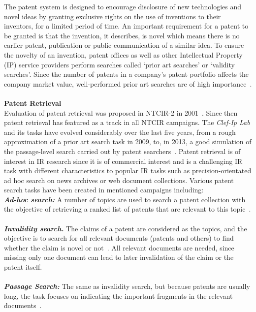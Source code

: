The patent system is designed to encourage disclosure of new technologies and novel ideas by granting exclusive rights on the use of inventions to their inventors, for a limited period of time. An important requirement for a patent to be granted is that the invention, it describes, is novel which means there is no earlier patent, publication or public communication of a similar idea. To ensure the novelty of an invention, patent offices as well as other Intellectual Property (IP) service providers perform searches called `prior art searches' or `validity searches’. Since the number of patents in a company's patent portfolio affects the company market value, well-performed prior art searches are of high importance~\citep{piroi2013overview}.\\\\
\noindent
\textbf{Patent Retrieval }
\ \\
Evaluation of patent retrieval was proposed in NTCIR-2 in 2001~\citep{leong2001patent}. Since then patent retrieval has featured as a track in all NTCIR campaigns. The \emph{Clef-Ip Lab} and its tasks have evolved considerably over the last five years, from a rough approximation of a prior art search task in 2009, to, in 2013, a good simulation of the passage-level search carried out by patent searchers~\citep{piroi2013passage}. Patent retrieval is of interest in IR research since it is of commercial interest and is a challenging IR task with different characteristics to popular IR tasks such as precision-orientated ad hoc search on news archives or web document collections. Various patent search tasks have been created in mentioned campaigns including:
\\
\textbf{\textit{Ad-hoc search:}} A number of topics are used to search a patent collection with the objective of retrieving a ranked list of patents that are relevant to this topic~\citep{iwayama2003overview}.\\\\
\textbf{\textit{Invalidity search.}} The claims of a patent are considered as the topics, and the objective is to search for all relevant documents (patents and others) to find whether the claim is novel or not~\citep{joho2010survey, fujii2004overview}. All relevant documents are needed, since missing only one document can lead to later invalidation of the claim or the patent itself.
\\\\
\textbf{\textit{Passage Search:}} The same as invalidity search, but because patents are usually long,
the task focuses on indicating the important fragments in the relevant documents~\citep{fujii2007overview}.\\\\
